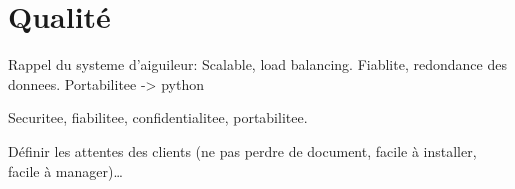 \chapter{Qualité}
\thispagestyle{EIP} %


Rappel du systeme d'aiguileur: Scalable, load balancing. Fiablite, redondance des donnees.
Portabilitee -> python

Securitee, fiabilitee, confidentialitee, portabilitee.

Définir les attentes des clients (ne pas perdre de document, facile à installer, facile à manager)…


